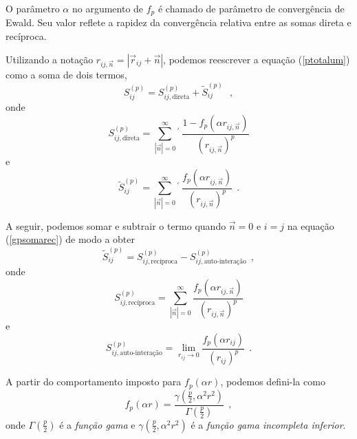 \documentclass[twocolumn,a4,11pt]{article}
\begin{document}
O parâmetro $\alpha$ no argumento de $f_{p}$ é chamado de parâmetro de convergência de Ewald. Seu valor reflete a rapidez da convergência relativa entre as somas direta e recíproca.

Utilizando a notação $r_{ij,\vec{n}}=\left| \vec{r}_{ij} + \vec{n} \right|$, podemos reescrever a equação (\ref{ptotalum}) como a soma de dois termos,
\begin{equation}
S_{ij}^{(p)}= S_{ij,\text{direta}}^{(p)} + \tilde{S}^{(p)}_{ij} ~~~,
\nonumber
\end{equation}
onde
\begin{equation}
S_{ij,\text{direta}}^{(p)}=\sum_{|\vec{n}|=0}^{\infty} {}^{\prime} ~
\frac{1-f_{p}(\alpha r_{ij,\vec{n}} ) }{
(r_{ij,\vec{n}})^{p} }
\label{gpsomadireta}
\end{equation}
e
\begin{equation}
\tilde{S}^{(p)}_{ij}=\sum_{|\vec{n}|=0}^{\infty} {}^{\prime} ~
 \frac{
f_{p}(\alpha r_{ij,\vec{n}})}{
(r_{ij,\vec{n}})^{p} } ~~ .
\label{gpsomarec}
\end{equation}

A seguir, podemos somar e subtrair o termo quando $\vec{n}=0$ e $i=j$ na equação (\ref{gpsomarec}) de modo a obter
\begin{equation}
\tilde{S}^{(p)}_{ij}=S^{(p)}_{ij,\text{recíproca}}-S_{ij,\text{auto-interação}}^{(p)} ~~ ,
\nonumber
\end{equation}
onde
\begin{equation}
S^{(p)}_{ij,\text{recíproca}} = \sum_{|\vec{n}|=0}^{\infty}
\frac{
f_{p}(\alpha r_{ij,\vec{n}})}{
(r_{ij,\vec{n}})^{p} }
\label{gpsomareciproca}
\end{equation}
e
\begin{equation}
S_{ij,\text{auto-interação}}^{(p)}= \lim_{r_{ij} \rightarrow 0} \frac{
f_{p}(\alpha r_{ij})}
{(r_{ij})^{p} } ~~ .
\label{gpautointeracao}
\end{equation}

\vspace{0.6cm}

A partir do comportamento imposto para $f_{p}(\alpha r)$, podemos defini-la como
\begin{equation}
f_{p}(\alpha r)= \frac{\gamma\left(\frac{p}{2},\alpha^{2} r^{2}\right)}{\Gamma\left(\frac{p}{2}\right)} ~~ ,
\label{gpgammainf}
\end{equation}
onde $\Gamma(\frac{p}{2})$  é a {\it função gama} e $\gamma(\frac{p}{2},\alpha^{2} r^{2} )$ é a {\it função gama incompleta inferior}. 
\end{document}
